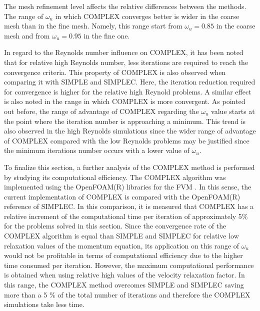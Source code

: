 \documentclass[final,3p,times,11pt,onecolumn]{myElsarticle}
\numberwithin{equation}{section}
\begin{document}
The mesh refinement level affects the relative differences between the methods. The range of $\omega_u$ in which COMPLEX converges better is wider in the coarse mesh than in the fine mesh. Namely, this range start from $\omega_u = 0.85$ in the coarse mesh and from $\omega_u = 0.95$ in the fine one.

In regard to the Reynolds number influence on COMPLEX, it has been noted that for relative high Reynolds number, less iterations are required to reach the convergence criteria. This property of COMPLEX is also observed when comparing it with SIMPLE and SIMPLEC. Here, the iteration reduction required for convergence is higher for the relative high Reynold problems. A similar effect is also noted in the range in which COMPLEX is more convergent. As pointed out before, the range of advantage of COMPLEX regarding the $\omega_u$ value starts at the point where the iteration number is approaching a minimum. This trend is also observed in the high Reynolds simulations since the wider range of advantage of COMPLEX compared with the low Reynolds problems may be justified since the minimum iterations number occurs with a lower value of $\omega_u$.


To finalize this section, a further analysis of the COMPLEX method is performed by studying its computational efficiency. The  COMPLEX algorithm was implemented using the OpenFOAM(R) libraries for the FVM \cite{ofpg}. In this sense, the current implementation of COMPLEX is compared with the OpenFOAM(R) reference of SIMPLEC. In this comparison, it is measured that COMPLEX  has a relative increment of the computational time per iteration of approximately 5$\%$  for the problems solved in this section. Since the convergence rate of the COMPLEX algorithm is equal than SIMPLE and SIMPLEC for relative low relaxation values of the momentum equation, its application on this range of $\omega_u$ would not be profitable in terms of computational efficiency due to the higher time consumed per iteration. However, the maximum computational performance is obtained when using relative high values of the velocity relaxation factor. In this range, the COMPLEX method overcomes SIMPLE and SIMPLEC saving more than a 5 $\%$ of the total number of iterations and therefore the COMPLEX simulations take less time. 
\end{document}
